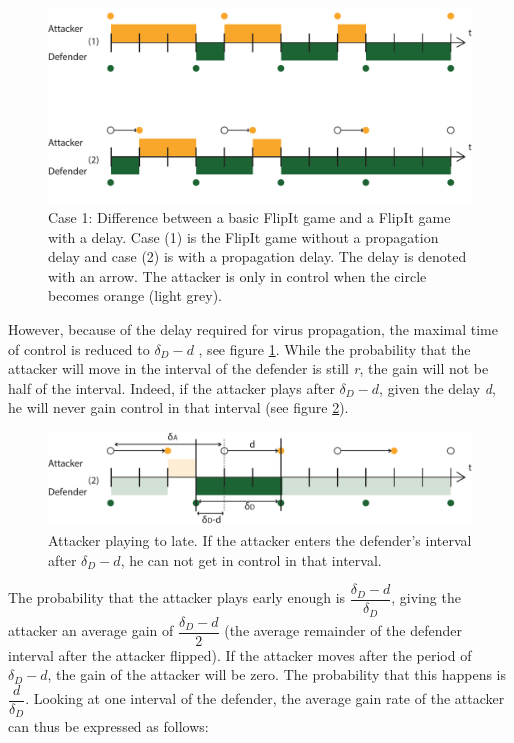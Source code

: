\begin{figure}[hbtp]
\centering
\includegraphics[scale=0.7]{../../doc/template/Images/DiffDelayCase1.pdf}
\caption{Case 1: Difference between a basic FlipIt game and a FlipIt game with a delay. Case (1) is the FlipIt game without a propagation delay and case (2) is with a propagation delay. The delay is denoted with an arrow. The attacker is only in control when the circle becomes orange (light grey).}
\label{fig:delaycase1}
\end{figure}




However, because of the delay required for virus propagation, the maximal time of control is reduced to $\delta_{D}-d$ , see figure \ref{fig:delaycase1}. While the probability that the attacker will move in the interval of the defender is still \textit{r}, the gain will not be half of the interval. Indeed, if the attacker plays after $\delta_{D}-d$, given the delay \textit{d}, he will never gain control in that interval (see figure \ref{tijdens interval}). 
\begin{figure}[hbtp]
\centering
\includegraphics[scale=0.7]{../../doc/template/Images/delaydtijdens.pdf}
\caption{Attacker playing to late. If the attacker enters the defender's interval after $\delta_{D} -d$, he can not get in control in that interval.}
\label{tijdens interval}
\end{figure}The probability that the attacker plays early enough is $\dfrac{\delta_{D}-d}{\delta_{D}}$, giving the attacker an average gain of $\dfrac{\delta_{D}-d}{2}$ (the average remainder of the defender interval after the attacker flipped). If the attacker moves after the period of $\delta_{D}-d$, the gain of the attacker will be zero. The probability that this happens is  $\dfrac{d}{\delta_{D}}$. Looking at one interval of the defender, the average gain rate of the attacker can thus be expressed as follows:


